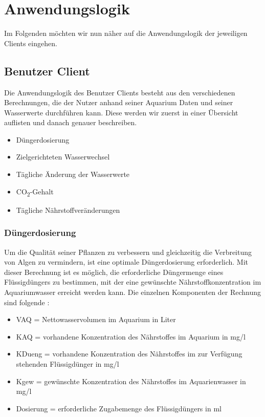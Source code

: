 \section{Anwendungslogik}

Im Folgenden möchten wir nun näher auf die Anwendungslogik der jeweiligen Clients eingehen. 

\subsection{Benutzer Client}

Die Anwendungslogik des Benutzer Clients besteht aus den verschiedenen Berechnungen, die der Nutzer anhand seiner Aquarium Daten und seiner Wasserwerte durchführen kann. Diese werden wir zuerst in einer Übersicht auflisten und danach genauer beschreiben.

\begin{itemize}
\item Düngerdosierung
\item Zielgerichteten Wasserwechsel
\item Tägliche Änderung der Wasserwerte
\item CO\textsubscript{2}-Gehalt
\item Tägliche Nährstoffveränderungen
\end{itemize}

\subsubsection{Düngerdosierung}

Um die Qualität seiner Pflanzen zu verbessern und gleichzeitig die Verbreitung von Algen zu vermindern, ist eine optimale Düngerdosierung erforderlich. Mit dieser Berechnung ist es möglich, die erforderliche Düngermenge eines Flüssigdüngers zu bestimmen, mit der eine gewünschte Nährstoffkonzentration im Aquariumwasser erreicht werden kann. Die einzelnen Komponenten der Rechnung sind folgende \autocite{Formel:Dosierung}:

\begin{itemize}
\item VAQ = Nettowasservolumen im Aquarium in Liter
\item KAQ = vorhandene Konzentration des Nährstoffes im Aquarium in mg/l
\item KDueng = vorhandene Konzentration des Nährstoffes im zur Verfügung stehenden Flüssigdünger in mg/l
\item Kgew = gewünschte Konzentration des Nährstoffes im Aquarienwasser in mg/l
\item Dosierung = erforderliche Zugabemenge des Flüssigdüngers in ml
\end{itemize}

